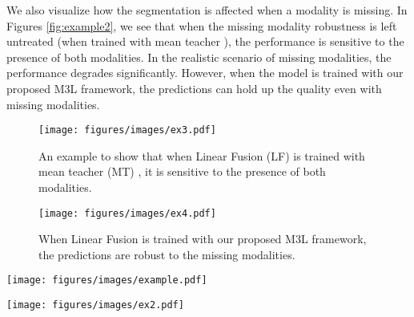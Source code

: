 \documentclass[10pt,twocolumn,letterpaper]{article}
\begin{document}
We also visualize how the segmentation is affected when a modality is missing. In Figures \ref{fig:example2}, we see that when the missing modality robustness is left untreated (when trained with mean teacher \cite{mt}), the performance is sensitive to the presence of both modalities. In the realistic scenario of missing modalities, the performance degrades significantly. However, when the model is trained with our proposed M3L framework, the predictions can hold up the quality even with missing modalities. 
\begin{figure}[]
\begin{center}
\texttt{[image: figures/images/ex3.pdf]}
\end{center}
\caption{\small{An example to show that when Linear Fusion (LF) is trained with mean teacher (MT) \cite{mt}, it is sensitive to the presence of both modalities.}}
\label{fig:example3}
\end{figure}
 \begin{figure}
\begin{center}
\texttt{[image: figures/images/ex4.pdf]}
\end{center}
\caption{\small{When Linear Fusion is trained with our proposed M3L framework, the predictions are robust to the missing modalities.}}
\label{fig:example4}
\end{figure}
 \begin{figure*}
\begin{center}
\texttt{[image: figures/images/example.pdf]}
\end{center}
\caption{Examples for different multi-modal models trained with supervised and semi-supervised frameworks.}
\label{fig:example}
\end{figure*}
 \begin{figure*}
\begin{center}
\texttt{[image: figures/images/ex2.pdf]}
\end{center}
\caption{Examples for visualizing drop in performance when a modality is missing and robustness to missing modality when trained with the propsed M3L framework.}
\label{fig:example2}
\end{figure*}
 
\end{document}
